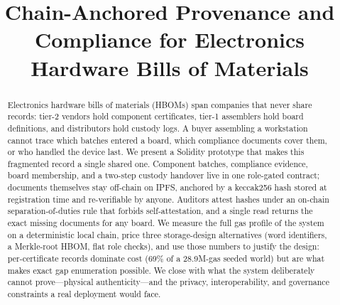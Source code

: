 \documentclass[conference]{IEEEtran}
\begin{document}
\title{Chain-Anchored Provenance and Compliance for Electronics Hardware Bills of Materials}

\author{
\and
{}
\and
{}
\and
{}
\and
{}
}

\maketitle

\begin{abstract}
Electronics hardware bills of materials (HBOMs) span companies that never share records: tier-2 vendors hold component certificates, tier-1 assemblers hold board definitions, and distributors hold custody logs. A buyer assembling a workstation cannot trace which batches entered a board, which compliance documents cover them, or who handled the device last. We present a Solidity prototype that makes this fragmented record a single shared one. Component batches, compliance evidence, board membership, and a two-step custody handover live in one role-gated contract; documents themselves stay off-chain on IPFS, anchored by a keccak256 hash stored at registration time and re-verifiable by anyone. Auditors attest hashes under an on-chain separation-of-duties rule that forbids self-attestation, and a single read returns the exact missing documents for any board. We measure the full gas profile of the system on a deterministic local chain, price three storage-design alternatives (word identifiers, a Merkle-root HBOM, flat role checks), and use those numbers to justify the design: per-certificate records dominate cost (69\% of a 28.9M-gas seeded world) but are what makes exact gap enumeration possible. We close with what the system deliberately cannot prove---physical authenticity---and the privacy, interoperability, and governance constraints a real deployment would face.
\end{abstract}
\end{document}
